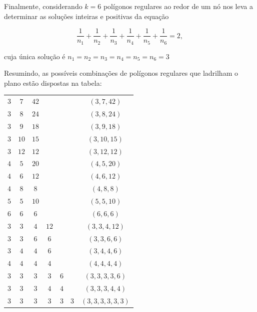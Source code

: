 Finalmente, considerando $k=6$ polígonos regulares ao redor de um nó nos leva a determinar as soluções inteiras e positivas da equação

\begin{equation*}
\frac{1}{n_1}+\frac{1}{n_2}+\frac{1}{n_3}+\frac{1}{n_4}+\frac{1}{n_5}+\frac{1}{n_6}=2,
\end{equation*}

cuja única solução é $n_1=n_2=n_3=n_4=n_5=n_6=3$

Resumindo, as possíveis combinações de polígonos regulares que ladrilham o plano estão dispostas na tabela:

\setlength\tabcolsep{5mm}
\begin{longtabu} to \textwidth{|c|c|c|c|c|c|c|}
\hline\endfirsthead
{} &  &  & &  &  &  \\
\hline
$3$ & $7$ & $42$ & & & & $(3,7,42)$ \\
\hline
$3$ & $8$ & $24$ & & & & $(3,8,24)$ \\
\hline
$3$ & $9$ & $18$ & & & & $(3,9,18)$ \\
\hline
$3$ & $10$ & $15$ & & & & $(3,10,15)$ \\
\hline
$3$ & $12$ & $12$ & & & & $(3,12,12)$ \\
\hline
$4$ & $5$ & $20$ & & & & $(4,5,20)$ \\
\hline
$4$ & $6$ & $12$ & & & & $(4,6,12)$ \\
\hline
$4$ & $8$ & $8$ & & & & $(4,8,8)$ \\
\hline
$5$ & $5$ & $10$ & & & & $(5,5,10)$ \\
\hline
$6$ & $6$ & $6$ & & & & $(6,6,6)$ \\
\hline
$3$ & $3$ & $4$ & $12$ & & & $(3,3,4,12)$ \\
\hline
$3$ & $3$ & $6$ & $6$ & & & $(3,3,6,6)$ \\
\hline
$3$ & $4$ & $4$ & $6$ & & & $(3,4,4,6)$ \\
\hline
$4$ & $4$ & $4$ & $4$ & & & $(4,4,4,4)$ \\
\hline
$3$ & $3$ & $3$ & $3$ & $6$ & & $(3,3,3,3,6)$ \\
\hline
$3$ & $3$ & $3$ & $4$ & $4$ & & $(3,3,3,4,4)$ \\
\hline
$3$ & $3$ & $3$ & $3$ & $3$ & $3$ & $(3,3,3,3,3,3)$ \\
\hline
\end{longtabu}

